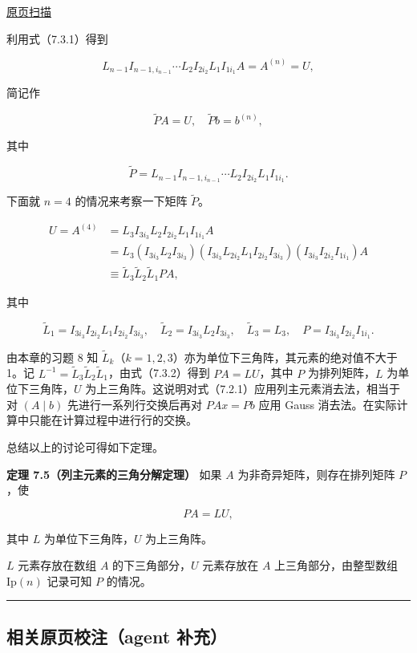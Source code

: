 \documentclass[
  10pt,
  fontset=fandol]{ctexart}
\begin{document}
\href{../../source-images/pdf-188.jpeg}{原页扫描}

利用式（7.3.1）得到

\[L_{n-1}I_{n-1,i_{n-1}}\cdots L_2I_{2i_2}L_1I_{1i_1}A=A^{(n)}=U,\]

简记作

\[\widetilde{P}A=U,\quad\widetilde{P}b=b^{(n)},\]

其中

\[\widetilde{P}=L_{n-1}I_{n-1,i_{n-1}}\cdots L_2I_{2i_2}L_1I_{1i_1}.\]

下面就 \(n=4\) 的情况来考察一下矩阵 \(\widetilde{P}\)。

\[
\begin{aligned}
U=A^{(4)}&=L_3I_{3i_3}L_2I_{2i_2}L_1I_{1i_1}A\\
&=L_3(I_{3i_3}L_2I_{3i_3})(I_{3i_3}L_{2i_2}L_1I_{2i_2}I_{3i_3})(I_{3i_3}I_{2i_2}I_{1i_1})A\\
&\equiv\widetilde{L}_3\widetilde{L}_2\widetilde{L}_1PA,
\end{aligned}
\tag{7.3.2}
\]

其中

\[\widetilde{L}_1=I_{3i_3}I_{2i_2}L_1I_{2i_2}I_{3i_3},\quad
\widetilde{L}_2=I_{3i_3}L_2I_{3i_3},\quad
\widetilde{L}_3=L_3,\quad P=I_{3i_3}I_{2i_2}I_{1i_1}.\]

由本章的习题 8 知 \(\widetilde{L}_k\)（\(k=1,2,3\)）亦为单位下三角阵，其元素的绝对值不大于 1。记 \(L^{-1}=\widetilde{L}_3\widetilde{L}_2\widetilde{L}_1\)，由式（7.3.2）得到 \(PA=LU\)，其中 \(P\) 为排列矩阵，\(L\) 为单位下三角阵，\(U\) 为上三角阵。这说明对式（7.2.1）应用列主元素消去法，相当于对 \((A\mid b)\) 先进行一系列行交换后再对 \(PAx=Pb\) 应用 Gauss 消去法。在实际计算中只能在计算过程中进行行的交换。

总结以上的讨论可得如下定理。

\textbf{定理 7.5（列主元素的三角分解定理）} 如果 \(A\) 为非奇异矩阵，则存在排列矩阵 \(P\)，使

\[PA=LU,\]

其中 \(L\) 为单位下三角阵，\(U\) 为上三角阵。

\(L\) 元素存放在数组 \(A\) 的下三角部分，\(U\) 元素存放在 \(A\) 上三角部分，由整型数组 \(\mathrm{Ip}(n)\) 记录可知 \(P\) 的情况。

\begin{center}\rule{0.5\linewidth}{0.5pt}\end{center}

\subsection{相关原页校注（agent 补充）}\label{ux76f8ux5173ux539fux9875ux6821ux6ce8agent-ux8865ux5145}
\end{document}
